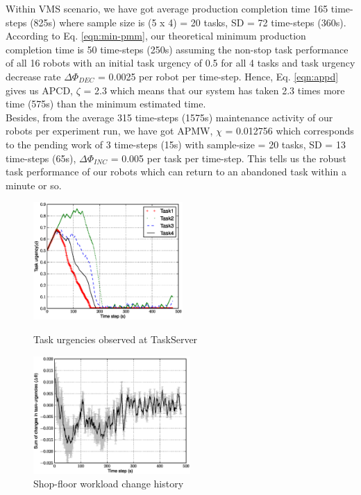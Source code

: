 \documentclass{llncs}
\begin{document}
Within VMS scenario, we have got average production completion time 165 time-steps (825s) where sample size is (5 x 4) =  20 tasks, SD = 72 time-steps (360s). According to Eq. \ref{eqn:min-pmm}, our theoretical minimum  production completion time is 50 time-steps (250s) assuming the non-stop task performance of all 16 robots with an initial task urgency of 0.5 for all 4 tasks and  task urgency decrease rate $\Delta \Phi_{DEC	}$ = 0.0025 per robot per time-step. Hence, Eq. \ref{eqn:appd} gives us APCD, $\zeta$ = 2.3 which means that our system has taken 2.3 times more time (575s) than the minimum estimated time.\\
Besides,  from the average 315 time-steps (1575s) maintenance activity of our robots per experiment run, we have got  APMW, $\chi$ = 0.012756  which corresponds to the pending work of 3 time-steps (15s) with sample-size = 20 tasks, SD = 13 time-steps (65s), $\Delta \Phi_{INC}$ = 0.005 per task per time-step. This tells us the robust task performance of our robots which can return to an abandoned task within a minute or so.
\begin{figure}
\begin{minipage}[t]{0.48\linewidth}
\centering
\includegraphics[height=4.5cm, angle=0]
{images/PlotUrgencyLog-2010May10-115549.eps}
\caption{\small Task urgencies observed at TaskServer}
\label{fig:raw-urgencies} %
\end{minipage}
\hspace{0.5cm}
\begin{minipage}[t]{0.48\linewidth}
\centering
\includegraphics[height=4.5cm, angle=0]{images/TaskUrgencyStat.eps}
\caption{\small Shop-floor workload change history} %
\label{fig:urgency-stat} %
\end{minipage}
\end{figure}
\end{document}

